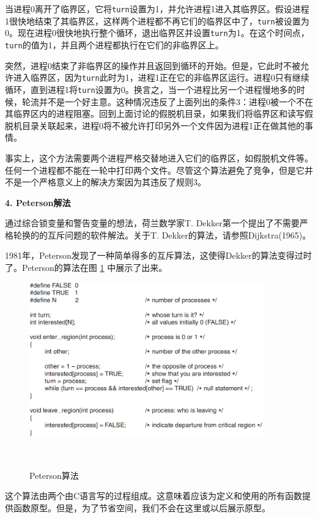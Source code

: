 	当进程0离开了临界区，它将\texttt{turn}设置为1，并允许进程1进入其临界区。假设进程1很快地结束了其临界区，这样两个进程都不再它们的临界区中了，\texttt{turn}被设置为0。现在进程0很快地执行整个循环，退出临界区并设置\texttt{turn}为1。在这个时间点，\texttt{turn}的值为1，并且两个进程都执行在它们的非临界区上。
	
	突然，进程0结束了非临界区的操作并且返回到循环的开始。但是，它此时不被允许进入临界区，因为\texttt{turn}此时为1，进程1正在它的非临界区运行。进程0只有继续循环，直到进程1将\texttt{turn}设置为0。换言之，当一个进程比另一个进程慢地多的时候，轮流并不是一个好主意。这种情况违反了上面列出的条件3：进程0被一个不在其临界区内的进程阻塞。回到上面讨论的假脱机目录，如果我们将临界区和读写假脱机目录关联起来，进程0将不被允许打印另外一个文件因为进程1正在做其他的事情。
	
	事实上，这个方法需要两个进程严格交替地进入它们的临界区，如假脱机文件等。任何一个进程都不能在一轮中打印两个文件。尽管这个算法避免了竞争，但是它并不是一个严格意义上的解决方案因为其违反了规则3。
	
	\textbf{4. Peterson解法}
	
	通过综合锁变量和警告变量的想法，荷兰数学家T. Dekker第一个提出了不需要严格轮换的的互斥问题的软件解法。关于T. Dekker的算法，请参照Dijkstra(1965)。
	
	1981年，Peterson发现了一种简单得多的互斥算法，这使得Dekker的算法变得过时了。Peterson的算法在图 \ref{fig:peterson} 中展示了出来。
	
	\begin{figure}[ht]\small
		\centering
		\includegraphics[width=0.90\textwidth]{FIG/2-24.png}
		\caption{Peterson算法}　\label{fig:peterson}
	\end{figure}

	这个算法由两个由C语言写的过程组成。这意味着应该为定义和使用的所有函数提供函数原型。但是，为了节省空间，我们不会在这里或以后展示原型。
	
